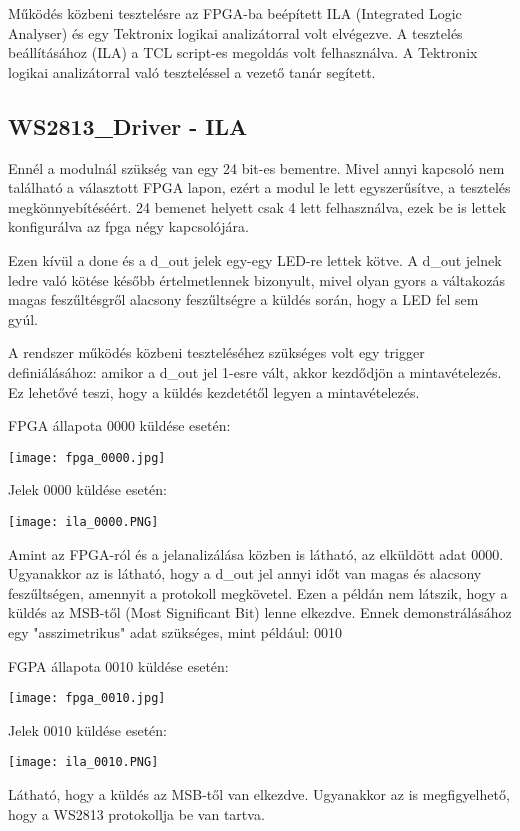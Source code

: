 \tab Működés közbeni tesztelésre az FPGA-ba beépített ILA (Integrated Logic Analyser) és egy Tektronix logikai analizátorral volt elvégezve. A tesztelés beállításához (ILA) a TCL script-es megoldás\cite{brassai2018ukda_ila} volt felhasználva.
A Tektronix logikai analizátorral való teszteléssel a vezető tanár segített.

\subsection{WS2813\_Driver - ILA}

\tab Ennél a modulnál szükség van egy 24 bit-es bementre. Mivel annyi kapcsoló nem található a választott FPGA lapon, ezért a modul le lett egyszerűsítve, a tesztelés megkönnyebítéséért. 
24 bemenet helyett csak 4 lett felhasználva, ezek be is lettek konfigurálva az fpga négy kapcsolójára.

\tab Ezen kívül a done és a d\_out jelek egy-egy LED-re lettek kötve. A d\_out jelnek ledre való kötése később értelmetlennek bizonyult, mivel olyan gyors a váltakozás magas feszűltésgről alacsony feszűltségre
a küldés során, hogy a LED fel sem gyúl.

\tab A rendszer működés közbeni teszteléséhez szükséges volt egy trigger definiálásához: amikor a d\_out jel 1-esre vált, akkor kezdődjön a mintavételezés. Ez lehetővé teszi, hogy a küldés kezdetétől legyen a mintavételezés.

\tab FPGA állapota 0000 küldése esetén:

\texttt{[image: fpga\_0000.jpg]}

\tab Jelek 0000 küldése esetén:

\texttt{[image: ila\_0000.PNG]}

\tab Amint az FPGA-ról és a jelanalizálása közben is látható, az elküldött adat 0000. Ugyanakkor az is látható, hogy a d\_out jel annyi időt van magas és alacsony feszűltségen, amennyit a protokoll megkövetel.
Ezen a példán nem látszik, hogy a küldés az MSB-től (Most Significant Bit) lenne elkezdve. Ennek demonstrálásához egy "asszimetrikus" adat szükséges, mint például: 0010

\tab FGPA állapota 0010 küldése esetén:

\texttt{[image: fpga\_0010.jpg]}

\tab Jelek 0010 küldése esetén:

\texttt{[image: ila\_0010.PNG]}

\tab Látható, hogy a küldés az MSB-től van elkezdve. Ugyanakkor az is megfigyelhető, hogy a WS2813 protokollja be van tartva.

